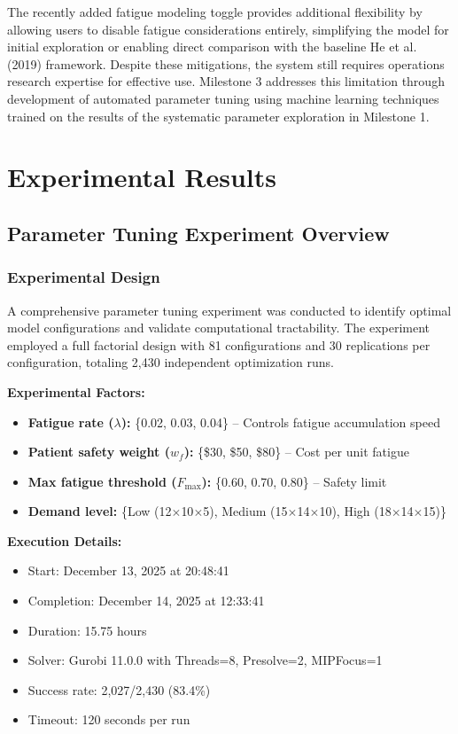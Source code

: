 \documentclass[11pt,letterpaper]{article}
\begin{document}
The recently added fatigue modeling toggle provides additional flexibility by allowing users to disable fatigue considerations entirely, simplifying the model for initial exploration or enabling direct comparison with the baseline He et al. (2019) framework. Despite these mitigations, the system still requires operations research expertise for effective use. Milestone 3 addresses this limitation through development of automated parameter tuning using machine learning techniques trained on the results of the systematic parameter exploration in Milestone 1.

\section{Experimental Results}

\subsection{Parameter Tuning Experiment Overview}

\subsubsection{Experimental Design}
A comprehensive parameter tuning experiment was conducted to identify optimal model configurations and validate computational tractability. The experiment employed a full factorial design with 81 configurations and 30 replications per configuration, totaling 2,430 independent optimization runs.

\textbf{Experimental Factors:}
\begin{itemize}[leftmargin=*]
    \item \textbf{Fatigue rate ($\lambda$):} \{0.02, 0.03, 0.04\} -- Controls fatigue accumulation speed
    \item \textbf{Patient safety weight ($w_f$):} \{\$30, \$50, \$80\} -- Cost per unit fatigue
    \item \textbf{Max fatigue threshold ($F_{\max}$):} \{0.60, 0.70, 0.80\} -- Safety limit
    \item \textbf{Demand level:} \{Low (12$\times$10$\times$5), Medium (15$\times$14$\times$10), High (18$\times$14$\times$15)\}
\end{itemize}

\textbf{Execution Details:}
\begin{itemize}[leftmargin=*]
    \item Start: December 13, 2025 at 20:48:41
    \item Completion: December 14, 2025 at 12:33:41
    \item Duration: 15.75 hours
    \item Solver: Gurobi 11.0.0 with Threads=8, Presolve=2, MIPFocus=1
    \item Success rate: 2,027/2,430 (83.4\%)
    \item Timeout: 120 seconds per run
\end{itemize}
\end{document}
